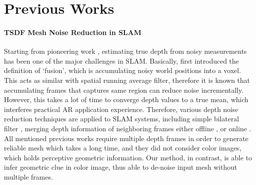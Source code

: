 \section{Previous Works}

\paragraph{TSDF Mesh Noise Reduction in SLAM}
Starting from pioneering work \cite{curless1996volumetric}, 
estimating true depth from noisy measurements 
has been one of the major challenges in SLAM. 
Basically, \cite{curless1996volumetric} first introduced the definition of ‘fusion’, 
which is accumulating noisy world positions into a voxel. 
This acts as similar with spatial running average filter, 
therefore it is known that accumulating frames 
that captures same region can reduce noise incrementally. 
However, this takes a lot of time to converge depth values 
to a true mean, which interferes practical AR application experience. 
Therefore, various depth noise reduction techniques are applied to SLAM systems, 
including simple bilateral filter \cite{newcombe2011kinectfusion},  merging depth information of neighboring frames either offline \cite{choi2015robust}\cite{zhou2018open3d}, or online \cite{cao2018real}\cite{yang2020noise}. 
All mentioned previous works require multiple depth frames 
in order to generate reliable mesh which takes a long time, 
and they did not consider color images, which holds perceptive geometric information. 
Our method, in contrast, is able to infer geometric clue in color image, 
thus able to de-noise input mesh without multiple frames.

